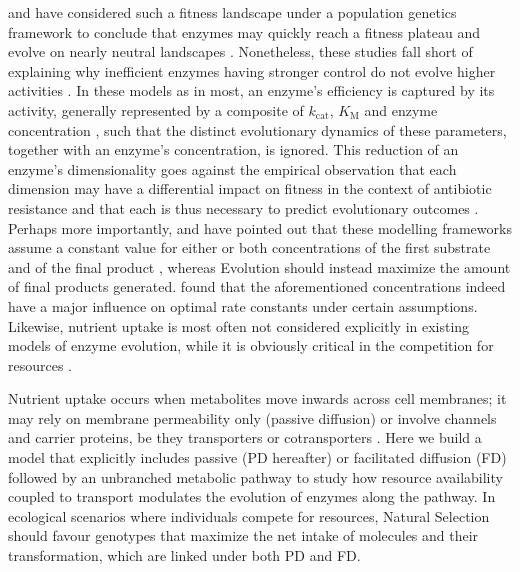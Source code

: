 \documentclass[nogrid,crop,final]{MBE2}%
\begin{document}
 \citet{Hartl85} and \citet{Dean86} have considered such a fitness landscape under a population genetics framework to conclude that enzymes may quickly reach a fitness plateau and evolve on nearly neutral landscapes \citep{Ohta92}. Nonetheless, these studies fall short of explaining why inefficient enzymes having stronger control do not evolve higher activities \citep{Yi19}. In these models as in most, an enzyme's efficiency is captured by its activity, generally represented by a composite of $k_\text{cat}$, $K_\text{M}$ and enzyme concentration \citep{Hartl85,Clark91,Chou14,Kaltenbach14}, such that the distinct evolutionary dynamics of these parameters, together with an enzyme's concentration, is ignored. This reduction of an enzyme's dimensionality goes against the empirical observation that each dimension may have a differential impact on fitness in the context of antibiotic resistance \citep{Walkiewicz12,Stiffler15,Rodrigues16} and that each is thus necessary to predict evolutionary outcomes \citep{Walkiewicz12}.\\

Perhaps more importantly, \citet{Heinrich91} and \citet{Schuster08} have pointed out that these modelling frameworks assume a constant value for either or both concentrations of the first substrate and of the final product \citep{Orth10}, whereas Evolution should instead maximize the amount of final products generated. \citet{Klipp94} found that the aforementioned concentrations indeed have a major influence on optimal rate constants under certain assumptions. 
Likewise, nutrient uptake is most often not considered explicitly in existing models of enzyme evolution, while it is obviously critical in the competition for resources \citep{Dykhuizen94}. 

Nutrient uptake occurs when metabolites move inwards across cell membranes; it may rely on membrane permeability only (passive diffusion) or involve channels and carrier proteins, be they transporters or cotransporters \citep{Stein86a}.
Here we build a model that explicitly includes passive (PD hereafter) or facilitated diffusion (FD) followed by an unbranched metabolic pathway to study how resource availability coupled to transport modulates the evolution of enzymes along the pathway.
In ecological scenarios where individuals compete for resources, Natural Selection should favour genotypes that maximize the net intake of molecules and their transformation, which are linked under both PD and FD.
\end{document}
